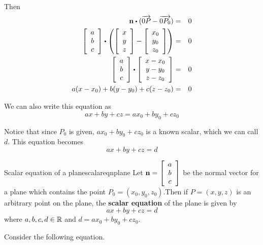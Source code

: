 Then 
\begin{eqnarray*}
\vect{n} \dotprod (\longvect{0P} - \longvect{0P_0}) &=& 0 \\
\leftB
\begin{array}{c}
a \\
b \\
c
\end{array}
\rightB
\dotprod
\left(
\leftB
\begin{array}{c}
x \\
y \\
z
\end{array}
\rightB
-
\leftB
\begin{array}{c}
x_0 \\
y_0 \\
z_0
\end{array}
\rightB
\right) 
&=& 0 \\
\leftB
\begin{array}{c}
a \\
b \\
c
\end{array}
\rightB
\dotprod
\leftB
\begin{array}{c}
x - x_0 \\
y - y_0 \\
z - z_0
\end{array}
\rightB
&=& 0 
\\
a(x - x_0) + b (y - y_0) + c (z-z_0) &=& 0 
\end{eqnarray*}

We can also write this equation as 
\[
ax + by + cz = ax_0 + by_0 + cz_0
\]

Notice that since $P_0$ is given, $ax_0+by_0+cz_0$ is a known scalar, which we can call $d$. This equation becomes
\[
ax + by + cz = d
\]

\begin{definition}{Scalar equation of a plane}{scalareqnplane}
Let ${\bf n} = \left[ 
\begin{array}{c}
a \\
b \\
c
\end{array}
\right] $
be the normal vector for a plane which contains the point $P_0 = (x_0, y_0, z_0)$.Then if $P=(x,y,z)$ is an arbitrary point on the plane, the \textbf{scalar equation} of the plane is given by
\[
ax + by + cz = d 
\]
where $ a,b,c,d \in \mathbb{R}$ and $d = ax_0 + by_0 + cz_0$.
\end{definition}

Consider the following equation.

